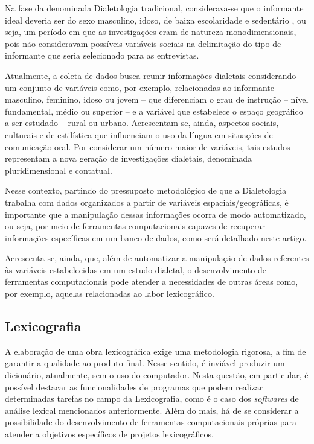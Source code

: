 \documentclass[portuguese]{textolivre}
\begin{document}
Na fase da denominada Dialetologia tradicional, considerava-se que o informante ideal deveria ser do sexo masculino, idoso, de baixa escolaridade e sedentário \cite[p. 84]{chambers1994}, ou seja, um período em que as investigações eram de natureza monodimensionais, pois não consideravam possíveis variáveis sociais na delimitação do tipo de informante que seria selecionado para as entrevistas. 

Atualmente, a coleta de dados busca reunir informações dialetais considerando um conjunto de variáveis como, por exemplo, relacionadas ao informante – masculino, feminino, idoso ou jovem – que diferenciam o grau de instrução – nível fundamental, médio ou superior – e a variável que estabelece o espaço geográfico a ser estudado – rural ou urbano. Acrescentam-se, ainda, aspectos sociais, culturais e de estilística que influenciam o uso da língua em situações de comunicação oral. Por considerar um número maior de variáveis, tais estudos representam a nova geração de investigações dialetais, denominada pluridimensional \cite[p. 48-49]{radtke1996} e contatual.  

Nesse contexto, partindo do pressuposto metodológico de que a Dialetologia trabalha com dados organizados a partir de variáveis espaciais/geográficas, é importante que a manipulação dessas informações ocorra de modo automatizado, ou seja, por meio de ferramentas computacionais capazes de recuperar informações específicas em um banco de dados, como será detalhado neste artigo.

Acrescenta-se, ainda, que, além de automatizar a manipulação de dados referentes às variáveis estabelecidas em um estudo dialetal, o desenvolvimento de ferramentas computacionais pode atender a necessidades de outras áreas como, por exemplo, aquelas relacionadas ao labor lexicográfico.


\subsection{Lexicografia}
A elaboração de uma obra lexicográfica exige uma metodologia rigorosa, a fim de garantir a qualidade ao produto final. Nesse sentido, é inviável produzir um dicionário, atualmente, sem o uso do computador. Nesta questão, em particular, é possível destacar as funcionalidades de programas que podem realizar determinadas tarefas no campo da Lexicografia, como é o caso dos \emph{softwares} de análise lexical mencionados anteriormente. Além do mais, há de se considerar a possibilidade do desenvolvimento de ferramentas computacionais próprias para atender a objetivos específicos de projetos lexicográficos.  
\end{document}
